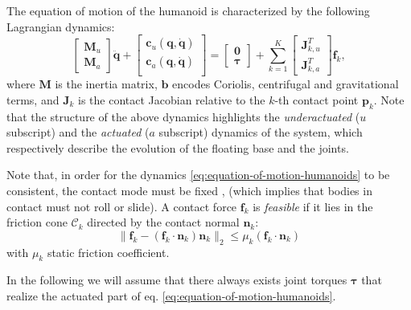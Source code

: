 The equation of motion of the humanoid \cite{Sugihara2020DynamicsofHumanoidRobots}
is characterized by the following Lagrangian dynamics:
\begin{equation}
    \begin{bmatrix}
        \bm{M}_u \\ \bm{M}_a
    \end{bmatrix} \ddot{\bm{q}} +
    \begin{bmatrix}
        \bm{c}_u(\bm{q}, \dot{\bm{q}}) \\
        \bm{c}_a(\bm{q}, \dot{\bm{q}}) \\
    \end{bmatrix} =
    \begin{bmatrix}
        \bm{0} \\ \bm{\tau}
    \end{bmatrix} +
    \sum_{k=1}^{K}
    \begin{bmatrix}
        \bm{J}_{k, u}^T \\ \bm{J}_{k, a}^T
    \end{bmatrix}
    \bm{f}_k,
    \label{eq:equation-of-motion-humanoids}
\end{equation}
where $\bm{M}$ is the inertia matrix, $\bm{b}$ encodes Coriolis, centrifugal
and gravitational terms, and $\bm{J}_k$ is the contact Jacobian relative to
the $k$-th contact point $\bm{p}_k$. Note that the structure of the
above dynamics highlights the \textit{underactuated} ($u$ subscript) and
the \textit{actuated} ($a$ subscript)
dynamics of the system, which respectively describe the evolution of the
floating base and the joints.

Note that, in order for the dynamics \eqref{eq:equation-of-motion-humanoids} to
be consistent, the contact mode must be fixed \cite{Balkcom2002Computingwrenchcones},
(which implies that bodies in contact must not roll or slide). A contact force $\bm{f}_k$ is
\textit{feasible} if it lies in the friction cone $\mathcal{C}_k$ directed by
the contact normal $\bm{n}_k$:
\begin{equation}
    \label{eq:feasible-contact-force}
    \| \bm{f}_k - (\bm{f}_k \cdot \bm{n}_k) \bm{n}_k \|_2 \le \mu_k (\bm{f}_k \cdot \bm{n}_k)
\end{equation}
with $\mu_k$ static friction coefficient.

In the following we will assume that there always exists joint torques
$\bm{\tau}$ that realize the actuated part of eq.
\eqref{eq:equation-of-motion-humanoids}.

